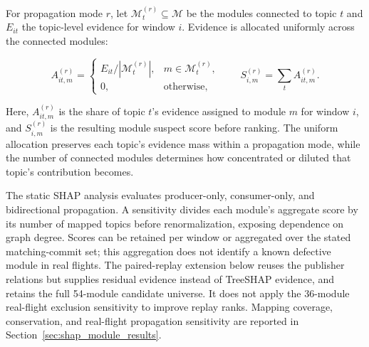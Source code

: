 For propagation mode $r$, let $\mathcal{M}_t^{(r)}\subseteq\mathcal{M}$ be the modules connected to topic $t$ and $E_{it}$ the topic-level evidence for window $i$. Evidence is allocated uniformly across the connected modules:

\[
A_{it,m}^{(r)}=\begin{cases}
E_{it}/|\mathcal{M}_t^{(r)}|,&m\in\mathcal{M}_t^{(r)},\\
0,&\text{otherwise},
\end{cases}
\qquad
S_{i,m}^{(r)}=\sum_t A_{it,m}^{(r)}.
\]

Here, $A_{it,m}^{(r)}$ is the share of topic $t$'s evidence assigned to module $m$ for window $i$, and $S_{i,m}^{(r)}$ is the resulting module suspect score before ranking. The uniform allocation preserves each topic's evidence mass within a propagation mode, while the number of connected modules determines how concentrated or diluted that topic's contribution becomes.

The static SHAP analysis evaluates producer-only, consumer-only, and bidirectional propagation. A sensitivity divides each module's aggregate score by its number of mapped topics before renormalization, exposing dependence on graph degree. Scores can be retained per window or aggregated over the stated matching-commit set; this aggregation does not identify a known defective module in real flights. The paired-replay extension below reuses the publisher relations but supplies residual evidence instead of TreeSHAP evidence, and retains the full 54-module candidate universe. It does not apply the 36-module real-flight exclusion sensitivity to improve replay ranks. Mapping coverage, conservation, and real-flight propagation sensitivity are reported in Section~\ref{sec:shap_module_results}.
